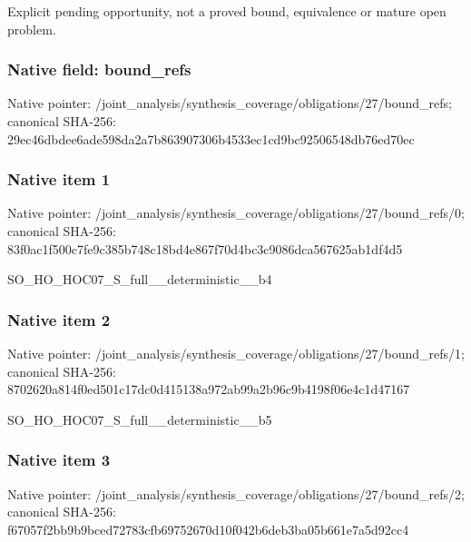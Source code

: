 \documentclass[10pt,a4paper]{article}
\begin{document}
\begingroup\raggedright\sloppy Explicit pending opportunity,\allowbreak{} not a proved bound,\allowbreak{} equivalence or mature open problem.\par\endgroup

\subsubsection{Native field: bound\_\allowbreak{}refs}
Native pointer: /joint\_\allowbreak{}analysis/synthesis\_\allowbreak{}coverage/obligations/27/bound\_\allowbreak{}refs; canonical SHA-256: 29ec46dbdee6ade598da2a7b863907306b4533ec1cd9bc92506548db76ed70ec

\subsubsection{Native item 1}
Native pointer: /joint\_\allowbreak{}analysis/synthesis\_\allowbreak{}coverage/obligations/27/bound\_\allowbreak{}refs/0; canonical SHA-256: 83f0ac1f500c7fe9c385b748c18bd4e867f70d4bc3c9086dca567625ab1df4d5

\begingroup\raggedright\sloppy SO\_\allowbreak{}HO\_\allowbreak{}HOC07\_\allowbreak{}S\_\allowbreak{}full\_\allowbreak{}\_\allowbreak{}deterministic\_\allowbreak{}\_\allowbreak{}b4\par\endgroup

\subsubsection{Native item 2}
Native pointer: /joint\_\allowbreak{}analysis/synthesis\_\allowbreak{}coverage/obligations/27/bound\_\allowbreak{}refs/1; canonical SHA-256: 8702620a814f0ed501c17dc0d415138a972ab99a2b96c9b4198f06e4c1d47167

\begingroup\raggedright\sloppy SO\_\allowbreak{}HO\_\allowbreak{}HOC07\_\allowbreak{}S\_\allowbreak{}full\_\allowbreak{}\_\allowbreak{}deterministic\_\allowbreak{}\_\allowbreak{}b5\par\endgroup

\subsubsection{Native item 3}
Native pointer: /joint\_\allowbreak{}analysis/synthesis\_\allowbreak{}coverage/obligations/27/bound\_\allowbreak{}refs/2; canonical SHA-256: f67057f2bb9b9bced72783cfb69752670d10f042b6deb3ba05b661e7a5d92cc4
\end{document}
